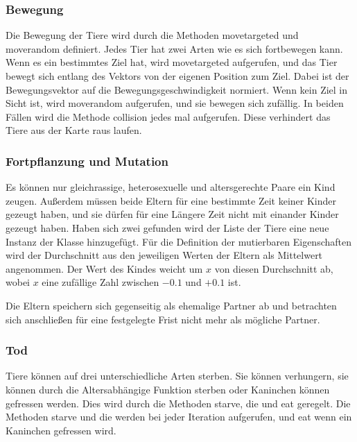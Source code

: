 \documentclass[12pt]{article}
\begin{document}
\subsubsection{Bewegung}
Die Bewegung der Tiere wird durch die Methoden \colorbox{gray!40}{movetargeted}
und \colorbox{gray!40}{moverandom} definiert.
Jedes Tier hat zwei Arten wie es sich fortbewegen kann.
Wenn es ein bestimmtes Ziel hat, wird \colorbox{gray!40}{movetargeted}
aufgerufen, und das Tier bewegt sich entlang des Vektors von der eigenen Position zum Ziel.
Dabei ist der Bewegungsvektor auf die Bewegungsgeschwindigkeit normiert.
Wenn kein Ziel in Sicht ist, wird \colorbox{gray!40}{moverandom} aufgerufen, und sie bewegen sich zufällig.
In beiden Fällen wird die Methode \colorbox{gray!40}{collision} jedes mal aufgerufen.
Diese verhindert das Tiere aus der Karte raus laufen.
\subsubsection{Fortpflanzung und Mutation}
Es können nur gleichrassige, heterosexuelle und altersgerechte Paare ein Kind zeugen.
Außerdem müssen beide Eltern für eine bestimmte Zeit keiner Kinder gezeugt haben, und sie dürfen für eine Längere Zeit nicht mit einander Kinder gezeugt haben.
Haben sich zwei gefunden wird der Liste der Tiere eine neue Instanz der Klasse hinzugefügt.
Für die Definition der mutierbaren  Eigenschaften wird der Durchschnitt aus den jeweiligen Werten der Eltern als Mittelwert angenommen.
Der Wert des Kindes weicht um $x$ von diesen Durchschnitt ab, wobei $x$ eine zufällige Zahl zwischen $-0.1$ und $+0.1$ ist.

Die Eltern speichern sich gegenseitig als ehemalige Partner ab und betrachten
sich anschließen für eine festgelegte Frist nicht mehr als mögliche Partner. 
\subsubsection{Tod}
Tiere können auf drei unterschiedliche Arten sterben.
Sie können verhungern, sie können durch die Altersabhängige Funktion sterben
oder Kaninchen können gefressen werden.
Dies wird durch die Methoden \colorbox{gray!40}{starve}, \colorbox{gray!40}{die}
und \colorbox{gray!40}{eat} geregelt.
Die Methoden \colorbox{gray!40}{starve} und \colorbox{gray!40}{die} werden bei
jeder Iteration aufgerufen, und \colorbox{gray!40}{eat} wenn ein Kaninchen gefressen wird.
\end{document}
